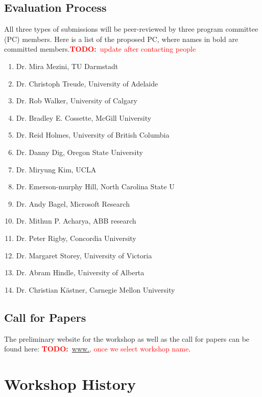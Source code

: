 \documentclass[10pt, conference]{IEEEtran}
\newcommand{\todo}[1]{{\textcolor{red}{\textbf{TODO:}~#1}}}
\begin{document}
\subsection{Evaluation Process}
All three types of submissions will be peer-reviewed by three program committee (PC) members. Here is a list of the proposed PC, where names in bold are committed members.\todo{update after contacting people}

\begin{enumerate}
\item Dr. Mira Mezini, TU Darmstadt
\item Dr. Christoph Treude, University of Adelaide 
\item Dr. Rob Walker, University of Calgary
\item Dr. Bradley E. Cossette, McGill University
\item Dr. Reid Holmes, University of British Columbia
\item Dr. Danny Dig, Oregon State University
\item Dr. Miryung Kim, UCLA
\item Dr. Emerson-murphy Hill, North Carolina State U
\item Dr. Andy Bagel, Microsoft Research
\item Dr. Mithun P. Acharya, ABB research
\item Dr. Peter Rigby, Concordia University
\item Dr. Margaret Storey, University of Victoria
\item Dr. Abram Hindle, University of Alberta
\item Dr. Christian K\"{a}stner, Carnegie Mellon University
\end{enumerate}

\subsection{Call for Papers}
The preliminary website for the workshop as well as the call for papers can be found here: \todo{\url{www.}, once we select workshop name}.

\section{Workshop History}
\end{document}
